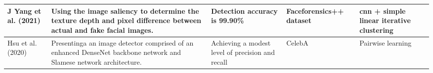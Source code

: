 \newpage
\begin{tabularx}{\textwidth}{|X|X|X|X|X|}\hline
  J Yang et al. (2021) \cite{yang2021detecting} & Using the image saliency to determine the texture depth and pixel difference between actual and fake facial images.& Detection accuracy is 99.90\% & Faceforensics++ dataset & \acrshort{cnn} + simple linear iterative clustering \\ \hline  

  Hsu et al.(2020) \cite{hung2021multi} & Presentinga an image detector comprised of an enhanced DenseNet backbone network and Slamese network architecture. & Achieving a modest level of precision and recall & CelebA & Pairwise learning \\ \hline
\end{tabularx}
